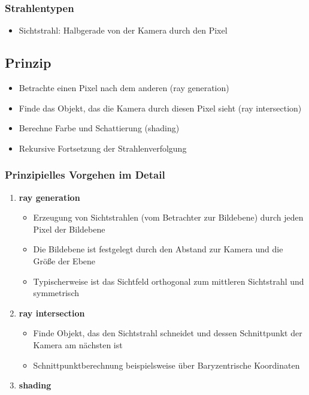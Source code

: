 \subsubsection{Strahlentypen}
\begin{itemize}
	\item Sichtstrahl: Halbgerade von der Kamera durch den Pixel
\end{itemize}


\subsection{Prinzip}
\begin{itemize}
	\item Betrachte einen Pixel nach dem anderen (ray generation)
	\item Finde das Objekt, das die Kamera durch diesen Pixel sieht (ray intersection)
	\item Berechne Farbe und Schattierung (shading)
	\item Rekursive Fortsetzung der Strahlenverfolgung
\end{itemize}

\subsubsection{Prinzipielles Vorgehen im Detail}
\begin{enumerate}
	\item \textbf{ray generation}
	\begin{itemize}
		\item Erzeugung von Sichtstrahlen (vom Betrachter zur Bildebene) durch jeden Pixel der Bildebene
		\item Die Bildebene ist festgelegt durch den Abstand zur Kamera und die Größe der Ebene
		\item Typischerweise ist das Sichtfeld orthogonal zum mittleren Sichtstrahl und symmetrisch 
	\end{itemize}
	\item \textbf{ray intersection}
	\begin{itemize}
		\item Finde Objekt, das den Sichtstrahl schneidet und dessen Schnittpunkt der Kamera am nächsten ist
		\item Schnittpunktberechnung beispielsweise über Baryzentrische Koordinaten
	\end{itemize}
	\item \textbf{shading}
\end{enumerate}



